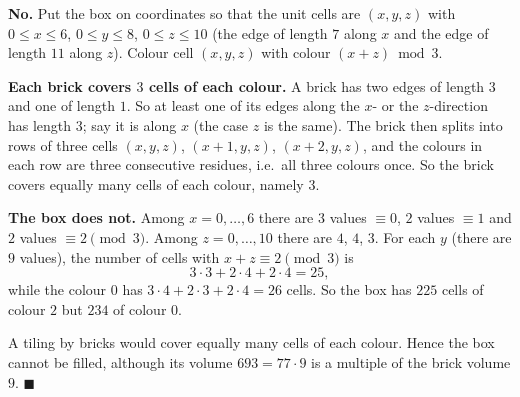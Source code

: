 \textbf{No.} Put the box on coordinates so that the unit cells are $(x,y,z)$ with $0\le x\le6$, $0\le y\le8$, $0\le z\le10$ (the edge of length $7$ along $x$ and the edge of length $11$ along $z$). Colour cell $(x,y,z)$ with colour $(x+z)\bmod3$.

\textbf{Each brick covers $3$ cells of each colour.} A brick has two edges of length $3$ and one of length $1$. So at least one of its edges along the $x$- or the $z$-direction has length $3$; say it is along $x$ (the case $z$ is the same). The brick then splits into rows of three cells $(x,y,z)$, $(x+1,y,z)$, $(x+2,y,z)$, and the colours in each row are three consecutive residues, i.e.\ all three colours once. So the brick covers equally many cells of each colour, namely $3$.

\textbf{The box does not.} Among $x=0,\dots,6$ there are $3$ values $\equiv0$, $2$ values $\equiv1$ and $2$ values $\equiv2\pmod3$. Among $z=0,\dots,10$ there are $4$, $4$, $3$. For each $y$ (there are $9$ values), the number of cells with $x+z\equiv2\pmod3$ is
\[
3\cdot3+2\cdot4+2\cdot4=25 ,
\]
while the colour $0$ has $3\cdot4+2\cdot3+2\cdot4=26$ cells. So the box has $225$ cells of colour $2$ but $234$ of colour $0$.

A tiling by bricks would cover equally many cells of each colour. Hence the box cannot be filled, although its volume $693=77\cdot9$ is a multiple of the brick volume $9$. $\blacksquare$
